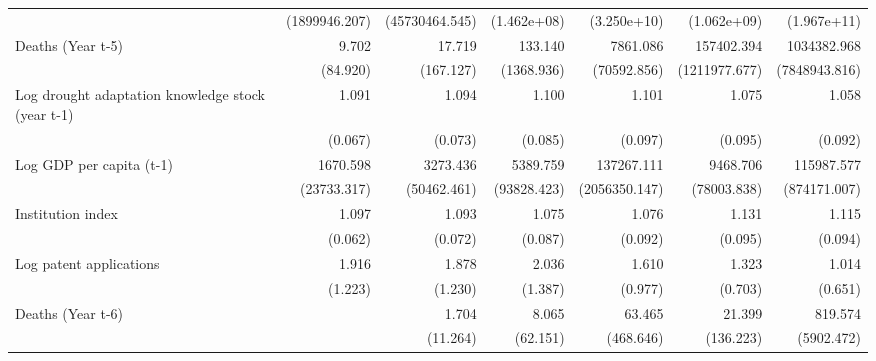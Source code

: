 \begin{table}[htbp]
\begin{tabular}{l*{6}{D{.}{.}{-1}}}
                    &(1899946.207)         &(45730464.545)         & (1.462e+08)         & (3.250e+10)         & (1.062e+09)         & (1.967e+11)         \\
\addlinespace
Deaths (Year t-5)   &       9.702         &      17.719         &     133.140         &    7861.086         &  157402.394\sym{\%}  & 1034382.968\sym{*}  \\
                    &    (84.920)         &   (167.127)         &  (1368.936)         & (70592.856)         &(1211977.677)         &(7848943.816)         \\
\addlinespace
Log drought adaptation knowledge stock (year t-1)&       1.091         &       1.094         &       1.100         &       1.101         &       1.075         &       1.058         \\
                    &     (0.067)         &     (0.073)         &     (0.085)         &     (0.097)         &     (0.095)         &     (0.092)         \\
\addlinespace
Log GDP per capita (t-1)&    1670.598         &    3273.436         &    5389.759         &  137267.111         &    9468.706         &  115987.577\sym{\%}  \\
                    & (23733.317)         & (50462.461)         & (93828.423)         &(2056350.147)         & (78003.838)         &(874171.007)         \\
\addlinespace
Institution index   &       1.097\sym{\%}  &       1.093         &       1.075         &       1.076         &       1.131\sym{\%}  &       1.115         \\
                    &     (0.062)         &     (0.072)         &     (0.087)         &     (0.092)         &     (0.095)         &     (0.094)         \\
\addlinespace
Log patent applications&       1.916         &       1.878         &       2.036         &       1.610         &       1.323         &       1.014         \\
                    &     (1.223)         &     (1.230)         &     (1.387)         &     (0.977)         &     (0.703)         &     (0.651)         \\
\addlinespace
Deaths (Year t-6)   &                     &       1.704         &       8.065         &      63.465         &      21.399         &     819.574         \\
                    &                     &    (11.264)         &    (62.151)         &   (468.646)         &   (136.223)         &  (5902.472)         \\

\end{tabular}
\end{table}

